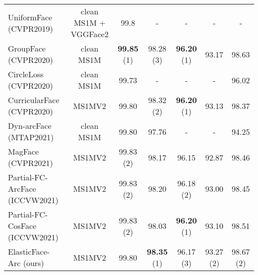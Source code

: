 \documentclass[letterpaper, 10 pt, conference]{ieeeconf}  \usepackage{times}
\begin{document}
\begin{table*}[ht!]
{\begin{tabular}{|l|c|c|c|c|c|c|}
UniformFace\cite{uniformface} (CVPR2019)            & clean MS1M \cite{DBLP:conf/eccv/GuoZHHG16,deng2019arcface}   + VGGFace2  \cite{DBLP:conf/fgr/CaoSXPZ18}                                                                & 99.8           & -              & -             & -              & -              \\
GroupFace\cite{groupface} (CVPR2020)              &  clean MS1M \cite{DBLP:conf/eccv/GuoZHHG16,deng2019arcface}                                                                  & \textbf{99.85} (1) & 98.28    (3)      & \textbf{96.20} (1) & 93.17 & 98.63          \\
CircleLoss\cite{cricleloss} (CVPR2020)            & clean MS1M \cite{DBLP:conf/eccv/GuoZHHG16,cricleloss}                                                           & 99.73          & -              & -             & -              & 96.02          \\
CurricularFace\cite{curricularface} (CVPR2020)          & MS1MV2  \cite{DBLP:conf/eccv/GuoZHHG16,deng2019arcface}                                                                     & 99.80           & 98.32 (2)         & \textbf{96.20} (1) & 93.13          & 98.37          \\
Dyn-arcFace \cite{dynarc} (MTAP2021)            & clean MS1M \cite{DBLP:conf/eccv/GuoZHHG16,deng2019arcface}                                                                        & 99.80           & 97.76          & -             & -              & 94.25          \\
MagFace\cite{magface} (CVPR2021)                 & MS1MV2  \cite{DBLP:conf/eccv/GuoZHHG16,deng2019arcface}                                                                      & 99.83    (2)      & 98.17          & 96.15         & 92.87          & 98.46          \\
Partial-FC-ArcFace \cite{an2020partical_fc} (ICCVW2021)    & MS1MV2 \cite{DBLP:conf/eccv/GuoZHHG16,deng2019arcface}                                                                      & 99.83 (2)         & 98.20          & 96.18   (2)      & 93.00             & 98.45          \\
Partial-FC-CosFace \cite{an2020partical_fc} (ICCVW2021)   & MS1MV2  \cite{DBLP:conf/eccv/GuoZHHG16,deng2019arcface}                                                                     & 99.83  (2)        & 98.03          & \textbf{96.20} (1) & 93.10           & 98.51          \\ \hline
ElasticFace-Arc (ours)    & MS1MV2 \cite{DBLP:conf/eccv/GuoZHHG16,deng2019arcface}                                                                      & 99.80          & \textbf{98.35} (1) & 96.17 (3)        & 93.27   (2)       & 98.67 (2) \\

\end{tabular}}
\end{table*}
\end{document}
